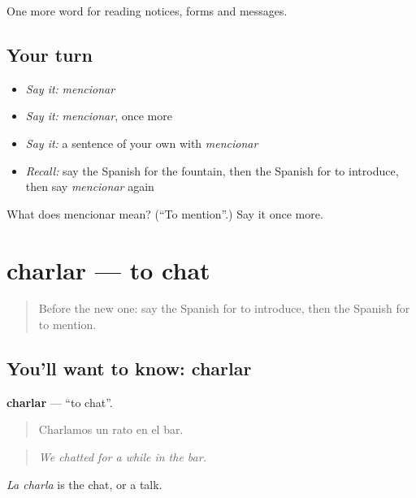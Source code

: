 \begin{grammarlens}[title={What you've built}]
One more word for reading notices, forms and messages.
\end{grammarlens}

\subsection*{Your turn}
\begin{itemize}
\raggedright
  \item \emph{Say it:} \emph{mencionar}
  \item \emph{Say it:} \emph{mencionar}, once more
  \item \emph{Say it:} a sentence of your own with \emph{mencionar}
  \item \emph{Recall:} say the Spanish for the fountain, then the Spanish for to introduce, then say \emph{mencionar} again
\end{itemize}

\begin{tcolorbox}[breakable,colback=teal!4,colframe=teal!35!black,title={Before you move on}]
What does mencionar mean? (\textquotedblleft{}To mention\textquotedblright{}.) Say it once more.
\end{tcolorbox}
\section[charlar]{charlar — to chat}

\label{lesson:ES-C502-charlar}



\begin{quote}
Before the new one: say the Spanish for to introduce, then the Spanish for to mention.
\end{quote}

\subsection*{You'll want to know: charlar}
\textbf{charlar} — \textquotedblleft{}to chat\textquotedblright{}.

\begin{quote}
Charlamos un rato en el bar.
\end{quote}

\begin{quote}
\emph{We chatted for a while in the bar.}
\end{quote}

\emph{La charla} is the chat, or a talk.

